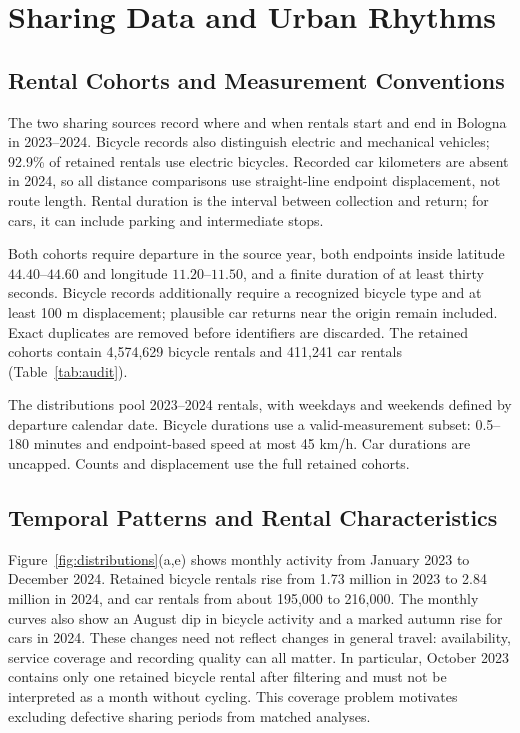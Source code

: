 \documentclass[]{interact}
\begin{document}
\section{Sharing Data and Urban Rhythms}
\label{sec:sharing}
\subsection{Rental Cohorts and Measurement Conventions}
The two sharing sources record where and when rentals start and end in Bologna in 2023--2024. Bicycle records also distinguish electric and mechanical vehicles; 92.9\% of retained rentals use electric bicycles. Recorded car kilometers are absent in 2024, so all distance comparisons use straight-line endpoint displacement, not route length. Rental duration is the interval between collection and return; for cars, it can include parking and intermediate stops.

Both cohorts require departure in the source year, both endpoints inside latitude $44.40$--$44.60$ and longitude $11.20$--$11.50$, and a finite duration of at least thirty seconds. Bicycle records additionally require a recognized bicycle type and at least 100 m displacement; plausible car returns near the origin remain included. Exact duplicates are removed before identifiers are discarded. The retained cohorts contain 4,574,629 bicycle rentals and 411,241 car rentals (Table~\ref{tab:audit}).

\begin{table}[t]
\caption{Rental cohorts under their mode-appropriate rules. Outside-box records are excluded from the study, not necessarily erroneous.}
\label{tab:audit}\centering\scriptsize

\end{table}

The distributions pool 2023--2024 rentals, with weekdays and weekends defined by departure calendar date. Bicycle durations use a valid-measurement subset: 0.5--180 minutes and endpoint-based speed at most 45 km/h. Car durations are uncapped. Counts and displacement use the full retained cohorts.

\subsection{Temporal Patterns and Rental Characteristics}
Figure~\ref{fig:distributions}(a,e) shows monthly activity from January 2023 to December 2024. Retained bicycle rentals rise from 1.73 million in 2023 to 2.84 million in 2024, and car rentals from about 195,000 to 216,000. The monthly curves also show an August dip in bicycle activity and a marked autumn rise for cars in 2024. These changes need not reflect changes in general travel: availability, service coverage and recording quality can all matter. In particular, October 2023 contains only one retained bicycle rental after filtering and must not be interpreted as a month without cycling. This coverage problem motivates excluding defective sharing periods from matched analyses.
\end{document}
